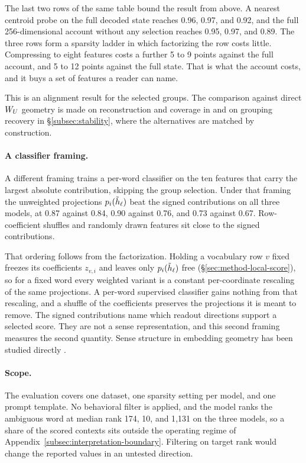 The last two rows of the same table bound the result from above. A
nearest centroid probe on the full decoded state reaches 0.96, 0.97, and
0.92, and the full 256-dimensional account without any selection
reaches 0.95, 0.97, and 0.89. The three rows form a sparsity
ladder in which factorizing the row costs little. Compressing to eight features
costs a further 5 to 9 points against the full account, and 5 to 12
points against the full state. That is what the account costs, and it
buys a set of features a reader can name.

This is an alignment result for the selected groups. The comparison
against direct \(W_U\) geometry is made on reconstruction and coverage
in  and on grouping recovery in
\S\ref{subsec:stability}, where the alternatives are matched by
construction.

\paragraph{A classifier framing.}
A different framing trains a per-word classifier on the ten features
that carry the largest absolute contribution, skipping the group
selection. Under that framing the unweighted projections
\(p_i(\tilde h_\ell)\) beat the signed contributions on all three models, at
0.87 against 0.84, 0.90 against 0.76, and 0.73 against 0.67. Row-coefficient shuffles and randomly drawn features sit close to
the signed contributions.

That ordering follows from the factorization. Holding a vocabulary row \(v\) fixed
freezes its coefficients \(z_{v,i}\) and leaves only \(p_i(\tilde h_\ell)\) free
(\S\ref{sec:method-local-score}), so for a fixed word every weighted
variant is a constant per-coordinate rescaling of the same projections.
A per-word supervised classifier gains nothing from that rescaling, and
a shuffle of the coefficients preserves the projections it is meant to
remove. The signed contributions name which readout directions support
a selected score. They are not a sense representation, and this second
framing measures the second quantity. Sense structure in embedding
geometry has been studied directly \citep{arora2018polysemy}.

\paragraph{Scope.}
The evaluation covers one dataset, one sparsity setting per model, and
one prompt template. No behavioral filter is applied, and the model
ranks the ambiguous word at median rank 174, 10, and 1{,}131 on the three
models, so a share of the scored contexts sits outside the operating
regime of Appendix~\ref{subsec:interpretation-boundary}. Filtering on
target rank would change the reported values in an untested direction.

